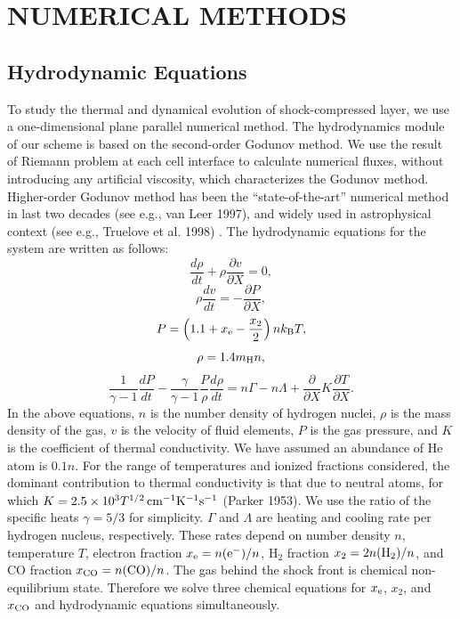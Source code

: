 \section{NUMERICAL METHODS}
\subsection{Hydrodynamic Equations}

To study the thermal and dynamical evolution of shock-compressed layer,
we use a one-dimensional plane parallel numerical method.
The hydrodynamics module of our scheme is based on the second-order 
Godunov method. 
We use the result of Riemann problem at each cell interface to calculate 
numerical fluxes, 
without introducing any artificial viscosity,  
which characterizes the Godunov method.  
Higher-order Godunov method has been the ``state-of-the-art'' 
numerical method in last two decades (see e.g., van Leer 1997), 
and widely used in astrophysical context 
(see e.g., Truelove et al. 1998) .  
The hydrodynamic equations for the system are written as follows:
\begin{equation}
\frac{d\rho}{dt}+\rho\frac{\partial v}{\partial X}=0,
\end{equation}
\begin{equation}
\rho\frac{dv}{dt}=-\frac{\partial P}{\partial X},
\end{equation}
\begin{equation}
P=\left(1.1+x_{\rm e}-\frac{x_2}{2}\right)n k_{\rm B}T,
\end{equation}
\begin{equation}
\rho=1.4m_{{\rm H}}n,
\end{equation}
\begin{equation}
\frac{1}{\gamma-1}\frac{dP}{dt}
-\frac{\gamma}{\gamma-1}\frac{P}{\rho}\frac{d\rho}{dt}
=n\Gamma-n\Lambda
+\frac{\partial}{\partial X}K\frac{\partial T}{\partial X}.
\end{equation}
In the above equations, $n$ is the number density of hydrogen nuclei,
$\rho$ is the mass density of the gas,
$v$ is the velocity of fluid elements, $P$ is the gas pressure,
and $K$ is the coefficient of thermal conductivity.
We have assumed an abundance of He atom is $0.1 n$.
For the range of temperatures and ionized fractions considered,
the dominant contribution to thermal conductivity is that 
due to neutral atoms, for which
$K = 2.5 \times 10^3 T^{1/2}\,{\rm cm^{-1} K^{-1} s^{-1}}$ (Parker 1953).
We use the ratio of the specific heats $\gamma=5/3$ for simplicity. 
$\Gamma$ and $\Lambda$ are heating and cooling rate per hydrogen nucleus,
respectively.
These rates depend on number density $n$, temperature $T$, 
electron fraction $x_{\rm e}=n({\rm e^-})/n$, 
H$_2$ fraction $x_2=2n({{\rm H}_2})/n$, 
and CO fraction $x_{{\rm CO}}=n({{\rm CO}})/n$.
The gas behind the shock front is chemical non-equilibrium state.
Therefore we solve three chemical equations for 
$x_{\rm e}$, $x_2$, and $x_{{\rm CO}}$ 
and hydrodynamic equations simultaneously.


